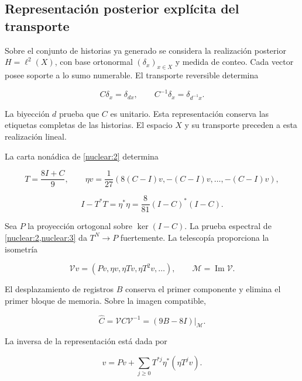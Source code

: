 \subsection{Representación posterior explícita del transporte}

Sobre el conjunto de historias ya generado se considera la realización
posterior \(H=\ell^2(X)\), con base ortonormal
\((\delta_x)_{x\in X}\) y medida de conteo. Cada vector posee soporte
a lo sumo numerable. El transporte reversible determina



\[
C\delta_x=\delta_{d x},\qquad C^{-1}\delta_x=\delta_{d^{-1}x}.
\]



La biyección \(d\) prueba que \(C\) es unitario.
Esta representación conserva las etiquetas completas de las historias.
El espacio \(X\) y su transporte preceden a esta realización lineal.

La carta nonádica de \cref{nuclear:2} determina



\[
T=\frac{8I+C}{9},\qquad
\eta v=\frac1{27}(8(C-I)v,-(C-I)v,\ldots,-(C-I)v),
\]





\[
I-T^*T=\eta^*\eta=\frac8{81}(I-C)^*(I-C).
\]



Sea \(P\) la proyección ortogonal sobre \(\ker(I-C)\).
La prueba espectral de \cref{nuclear:2,nuclear:3} da
\(T^N\to P\) fuertemente. La telescopía proporciona la isometría



\[
\mathcal Vv=(Pv,\eta v,\eta Tv,\eta T^2v,\ldots),\qquad
\mathcal M=\operatorname{Im}\mathcal V.
\]



El desplazamiento de registros \(B\) conserva el primer componente
y elimina el primer bloque de memoria. Sobre la imagen compatible,



\begin{equation}
\boxed{\widehat C=\mathcal VC\mathcal V^{-1}
=(9B-8I)|_{\mathcal M}.}
\label{nuc09:transporte-recuperado}
\end{equation}



La inversa de la representación está dada por



\begin{equation}
v=Pv+\sum_{j\ge0}T^{*j}\eta^*(\eta T^jv).
\label{nuc09:inversa-registro}
\end{equation}



